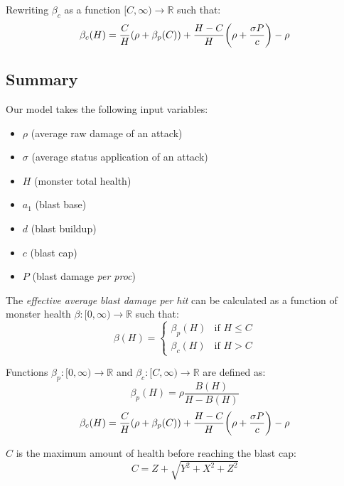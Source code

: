 \documentclass{article}
\begin{document}
Rewriting $\beta_c$ as a function $[C, \infty) \to \mathbb{R}$ such that:
\begin{equation}
    \beta_c (H) = \frac{C}{H} \parens*{\rho + \beta_p(C)} + \frac{H - C}{H} \parens*{\rho + \frac{\sigma P}{c}} - \rho
\end{equation}


\subsection{Summary}%
\label{sub:continuous_model_summary}

Our model takes the following input variables:
\begin{itemize}
    \item $\rho$ (average raw damage of an attack)
    \item $\sigma$ (average status application of an attack)
    \item $H$ (monster total health)
    \item $a_1$ (blast base)
    \item $d$ (blast buildup)
    \item $c$ (blast cap)
    \item $P$ (blast damage \textit{per proc})
\end{itemize}

The \textit{effective average blast damage per hit} can be calculated as a function of monster health $\beta : [0, \infty) \to \mathbb{R}$ such that:
\begin{equation}
    \beta (H) =
        \begin{cases}
            \beta_p (H) & \text{if } H \le C \\
            \beta_c (H) & \text{if } H > C
        \end{cases}
\end{equation}

Functions $\beta_p : [0, \infty) \to \mathbb{R}$ and $\beta_c : [C, \infty) \to \mathbb{R}$ are defined as:
\begin{equation}
    \beta_p (H) = \rho \frac{B(H)}{H - B(H)}
\end{equation}
\begin{equation}
    \beta_c (H) = \frac{C}{H} \parens*{\rho + \beta_p(C)} + \frac{H - C}{H} \parens*{\rho + \frac{\sigma P}{c}} - \rho
\end{equation}

$C$ is the maximum amount of health before reaching the blast cap:
\begin{equation}
    C = Z + \sqrt{Y^2 + X^2 + Z^2}
\end{equation}
\end{document}
